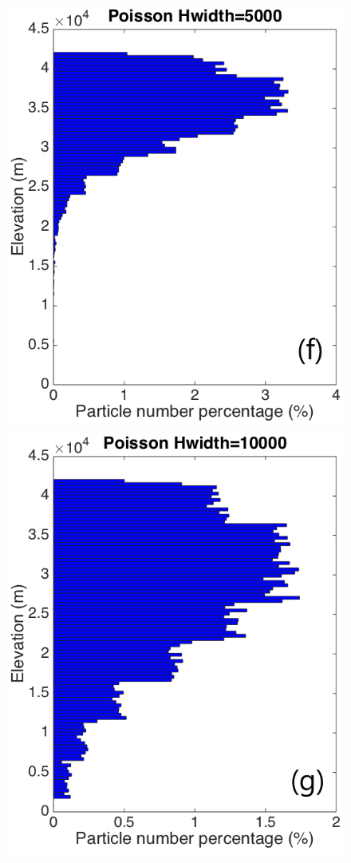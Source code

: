 \documentclass[draft,linenumbers]{agujournal2019}
\begin{document}
\begin{figure}[!htb]
\begin{minipage}{.325 \textwidth}
\includegraphics[width=0.99 \textwidth]{Figures/Possion-Hwidth5k-ParticleDis-z}
\end{minipage}%
\begin{minipage}{.325 \textwidth}
\centering
\includegraphics[width=0.99 \textwidth]{Figures/Possion-Hwidth10k-ParticleDis-z}

\end{minipage}
\end{figure}
\end{document}

